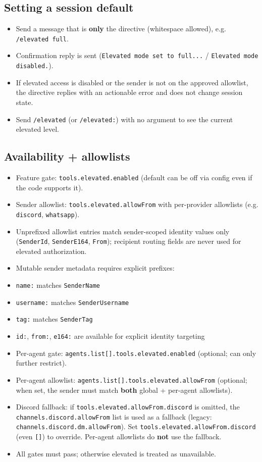 \subsection{Setting a session default}


\begin{itemize}
  \item Send a message that is \textbf{only} the directive (whitespace allowed), e.g. \texttt{/elevated full}.
  \item Confirmation reply is sent (\texttt{Elevated mode set to full...} / \texttt{Elevated mode disabled.}).
  \item If elevated access is disabled or the sender is not on the approved allowlist, the directive replies with an actionable error and does not change session state.
  \item Send \texttt{/elevated} (or \texttt{/elevated:}) with no argument to see the current elevated level.
\end{itemize}


\subsection{Availability + allowlists}


\begin{itemize}
  \item Feature gate: \texttt{tools.elevated.enabled} (default can be off via config even if the code supports it).
  \item Sender allowlist: \texttt{tools.elevated.allowFrom} with per-provider allowlists (e.g. \texttt{discord}, \texttt{whatsapp}).
  \item Unprefixed allowlist entries match sender-scoped identity values only (\texttt{SenderId}, \texttt{SenderE164}, \texttt{From}); recipient routing fields are never used for elevated authorization.
  \item Mutable sender metadata requires explicit prefixes:
  \item \texttt{name:} matches \texttt{SenderName}
  \item \texttt{username:} matches \texttt{SenderUsername}
  \item \texttt{tag:} matches \texttt{SenderTag}
  \item \texttt{id:}, \texttt{from:}, \texttt{e164:} are available for explicit identity targeting
  \item Per-agent gate: \texttt{agents.list[].tools.elevated.enabled} (optional; can only further restrict).
  \item Per-agent allowlist: \texttt{agents.list[].tools.elevated.allowFrom} (optional; when set, the sender must match \textbf{both} global + per-agent allowlists).
  \item Discord fallback: if \texttt{tools.elevated.allowFrom.discord} is omitted, the \texttt{channels.discord.allowFrom} list is used as a fallback (legacy: \texttt{channels.discord.dm.allowFrom}). Set \texttt{tools.elevated.allowFrom.discord} (even \texttt{[]}) to override. Per-agent allowlists do \textbf{not} use the fallback.
  \item All gates must pass; otherwise elevated is treated as unavailable.
\end{itemize}


